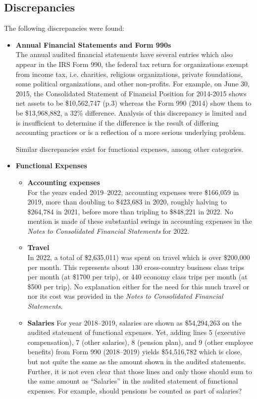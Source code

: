 \subsection{Discrepancies}\indent%
\label{sec:discrepancies}

The following discrepancies were found:
\begin{itemize}
  \item \textbf{Annual Financial Statements and Form 990s}\\
  The annual audited financial statements have several entries which also appear in the IRS Form 990, the federal tax return for organizations exempt from income tax, i.e. charities, religious organizations, private foundations, some political organizations, and other non-profits. For example, on June 30, 2015, the Consolidated Statement of Financial Position for 2014-2015 shows net assets to be \$10,562,747 (p.3) whereas the Form 990 (2014) show them to be \$13,968,882, a 32\% difference. Analysis of this discrepancy is limited and is insufficient to determine if the difference is the result of differing accounting practices or is a reflection of a more serious underlying problem.

  Similar discrepancies exist for functional expenses, among other categories.
  \item \textbf{Functional Expenses}\\
  \begin{itemize}
    \item \textbf{Accounting expenses}\\
    For the years ended 2019–2022, accounting expenses were \$166,059 in 2019, more than doubling to \$423,683 in 2020, roughly halving to \$264,784 in 2021, before more than tripling to \$848,221 in 2022. No mention is made of these substantial swings in accounting expenses in the \textit{Notes to Consolidated Financial Statements} for 2022.
    \item \textbf{Travel}\\
    In 2022, a total of \$2,635,011) was spent on travel which is over \$200,000 per month. This represents about 130 cross-country business class trips per month (at \$1700 per trip), or 440 economy class trips per month (at \$500 per trip). No explanation either for the need for this much travel or nor its cost was provided in the \textit{Notes to Consolidated Financial Statements}.
    \item \textbf{Salaries} For year 2018–2019, salaries are shown as \$54,294,263 on the audited statement of functional expenses. Yet, adding lines 5 (executive compensation), 7 (other salaries), 8 (pension plan), and 9 (other employee benefits) from Form 990 (2018–2019) yields \$54,516,782 which is close, but not quite the same as the amount shown in the audited statements. Further, it is not even clear that those lines and only those should sum to the same amount as ``Salaries'' in the audited statement of functional expenses.  For example, should pensions be counted as part of salaries? 
  \end{itemize}
\end{itemize}

